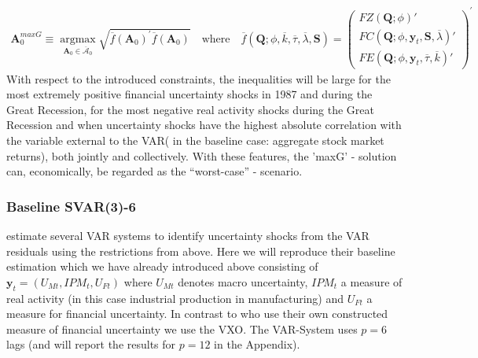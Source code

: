 \documentclass[a4paper,11pt,listof=nochaptergap,oneside,pointednumbers,bibtotoc,bigheadings,liststotoc]{scrbook}
\theoremstyle{mysatz}
\theoremstyle{mydefinition}
\theoremstyle{mybemerkung}
\renewcommand*{\paragraph}[1]{\subsubsection*{#1} \vspace{-3mm}} %
\newcommand{\vect}[1]{\boldsymbol{\mathbf{#1}}}
\begin{document}
\begin{itemize}
\begin{equation} \label{eq:svar_ludvi16}
\begin{split}
\vect{A}_0^{maxG} \equiv \operatorname*{argmax}_{\vect{A}_0 \in \overline{\vect{\mathcal{A}}}_0} \sqrt{\overline{f}(\vect{A}_0)^'\overline{f}(\vect{A}_0)} \quad \text{where} \quad \overline{f}(\vect{Q}; \phi, \overline{k}, \overline{\tau}, \overline{\lambda}, \vect{S}) = \begin{pmatrix}
			FZ(\vect{Q}; \phi)' \\
			FC(\vect{Q}; \phi, \vect{y}_t, \vect{S}, \overline{\lambda})' \\
			FE(\vect{Q}; \phi, \vect{y}_t, \overline{\tau}, \overline{k})'	
		\end{pmatrix}^'
\end{split}								
\end{equation}
With respect to the introduced constraints, the inequalities will be large for the most extremely positive financial uncertainty shocks in 1987 and during the Great Recession, for the most negative real activity shocks during the Great Recession and when uncertainty shocks have the highest absolute correlation with the variable external to the VAR( in the baseline case: aggregate stock market returns), both jointly and collectively. With these features, the 'maxG' - solution can, economically, be regarded as the ``worst-case'' - scenario.

\paragraph{Baseline SVAR(3)-6}
\citet{ludvigsonetal:18} estimate several VAR systems to identify uncertainty shocks from the VAR residuals using the restrictions from above. Here we will reproduce their baseline estimation which we have already introduced above consisting of $\vect{y}_t = (U_{Mt}, IPM_{t}, U_{Ft})$ where $U_{Mt}$ denotes macro uncertainty, $IPM_{t}$ a measure of real activity (in this case industrial production in manufacturing) and $U_{Ft}$ a measure for financial uncertainty. In contrast to \citet{ludvigsonetal:18} who use their own constructed measure of financial uncertainty we use the VXO. The VAR-System uses $p=6$ lags (and will report the results for $p=12$ in the Appendix).


\end{itemize}
\end{document}
